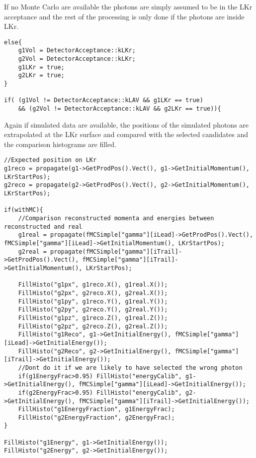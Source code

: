 If no Monte Carlo are available the photons are simply assumed to be in the LKr acceptance and the
rest of the processing is only done if the photons are inside LKr.
\begin{lstlisting}
else{
	g1Vol = DetectorAcceptance::kLKr;
	g2Vol = DetectorAcceptance::kLKr;
	g1LKr = true;
	g2LKr = true;
}

if( (g1Vol != DetectorAcceptance::kLAV && g1LKr == true)
	&& (g2Vol != DetectorAcceptance::kLAV && g2LKr == true)){
\end{lstlisting}

Again if simulated data are available, the positions of the simulated photons are extrapolated at
the LKr surface and compared with the selected candidates and the comparison histograms are filled.
\begin{lstlisting}
//Expected position on LKr
g1reco = propagate(g1->GetProdPos().Vect(), g1->GetInitialMomentum(), LKrStartPos);
g2reco = propagate(g2->GetProdPos().Vect(), g2->GetInitialMomentum(), LKrStartPos);

if(withMC){
	//Comparison reconstructed momenta and energies between reconstructed and real
	g1real = propagate(fMCSimple["gamma"][iLead]->GetProdPos().Vect(), fMCSimple["gamma"][iLead]->GetInitialMomentum(), LKrStartPos);
	g2real = propagate(fMCSimple["gamma"][iTrail]->GetProdPos().Vect(), fMCSimple["gamma"][iTrail]->GetInitialMomentum(), LKrStartPos);

	FillHisto("g1px", g1reco.X(), g1real.X());
	FillHisto("g2px", g2reco.X(), g2real.X());
	FillHisto("g1py", g1reco.Y(), g1real.Y());
	FillHisto("g2py", g2reco.Y(), g2real.Y());
	FillHisto("g1pz", g1reco.Z(), g1real.Z());
	FillHisto("g2pz", g2reco.Z(), g2real.Z());
	FillHisto("g1Reco", g1->GetInitialEnergy(), fMCSimple["gamma"][iLead]->GetInitialEnergy());
	FillHisto("g2Reco", g2->GetInitialEnergy(), fMCSimple["gamma"][iTrail]->GetInitialEnergy());
	//Dont do it if we are likely to have selected the wrong photon
	if(g1EnergyFrac>0.95) FillHisto("energyCalib", g1->GetInitialEnergy(), fMCSimple["gamma"][iLead]->GetInitialEnergy());
	if(g2EnergyFrac>0.95) FillHisto("energyCalib", g2->GetInitialEnergy(), fMCSimple["gamma"][iTrail]->GetInitialEnergy());
	FillHisto("g1EnergyFraction", g1EnergyFrac);
	FillHisto("g2EnergyFraction", g2EnergyFrac);
}

FillHisto("g1Energy", g1->GetInitialEnergy());
FillHisto("g2Energy", g2->GetInitialEnergy());
\end{lstlisting}

